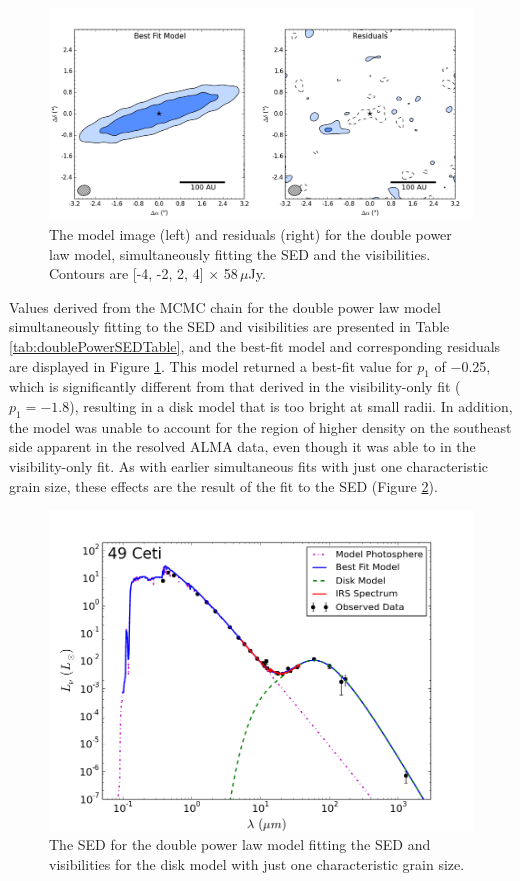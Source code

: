 {{\begin{figure}
\centering
\includegraphics[width = 1\textwidth]{49CET_DoublePowerSED_ModelResidual.png}
\caption{The model image (left) and residuals (right) for the double power law model, simultaneously fitting the SED and the visibilities. Contours are [-4, -2, 2, 4] $\times$ 58$\,\mu$Jy.}
\label{fig:49CET_DoublePowerSED_ModelResidual}
\end{figure}

Values derived from the MCMC chain for the double power law model simultaneously fitting to the SED and visibilities are presented in Table \ref{tab:doublePowerSEDTable}, and the best-fit model and corresponding residuals are displayed in Figure \ref{fig:49CET_DoublePowerSED_ModelResidual}. This model returned a best-fit value for $p_{1}$ of $-$0.25, which is significantly different from that derived in the visibility-only fit ($p_{1} = -1.8$), resulting in a disk model that is too bright at small radii. In addition, the model was unable to account for the region of higher density on the southeast side apparent in the resolved ALMA data, even though it was able to in the visibility-only fit. As with earlier simultaneous fits with just one characteristic grain size, these effects are the result of the fit to the SED (Figure \ref{fig:49CET_DP_SED}). 

\begin{figure}%
\label{fig:49CET_DP_SED}
\centering
\includegraphics[width = 1\textwidth]{49CET_DP_SED.png}
\caption{The SED for the double power law model fitting the SED and visibilities for the disk model with just one characteristic grain size. }
\label{fig:49CET_DP_SED}
\end{figure}

}}
